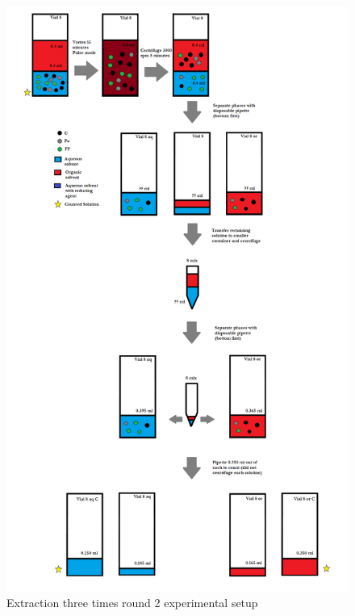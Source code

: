 \documentclass[idxtotoc,hyperref,openany,oneside]{labbook} %
\begin{document}
\begin{figure}[H] %
\begin{center}
  \includegraphics[width=0.8\linewidth]
                  {Figures/Cycle_x3_round_2}
\end{center}
\caption{Extraction three times round 2 experimental setup}
\label{fig:example2}
\end{figure}



\end{document}
